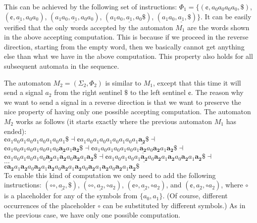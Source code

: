 \begin{example}
This can be achieved by the following set of instructions: $\Phi_1 = \{ (\cent, a_0 a_0 a_0 a_0, \$)$, $(\cent, \underline{a_1}, a_0 a_0)$, $(a_1 a_0, \underline{a_1}, a_0 a_0)$, $(a_1 a_0, \underline{a_1}, a_0 \$)$, $(a_1 a_0, \underline{a_1}, \$) \}$. It can be easily verified that the only words accepted by the automaton $M_1$ are the words shown in the above accepting computation. This is because if we proceed in the reverse direction, starting from the empty word, then we basically cannot get anything else than what we have in the above computation. This property also holds for all subsequent automata in the sequence.

The automaton $M_2 = (\Sigma_2, \Phi_2)$ is similar to $M_1$, except that this time it will send a signal $a_2$ from the right sentinel $\$$ to the left sentinel $\cent$. The reason why we want to send a signal in a reverse direction is that we want to preserve the nice property of having only one possible accepting computation. The automaton $M_2$ works as follows (it starts exactly where the previous automaton $M_1$ has ended):
\\

\indent $\cent a_1 a_0 a_1 a_0 a_1 a_0 a_1 a_0 a_1 \$ \dashv 
\cent a_1 a_0 a_1 a_0 a_1 a_0 a_1 a_0 a_1 \underline{\mathbf{a_2}} \$ \dashv$\\
\indent $\cent a_1 a_0 a_1 a_0 a_1 a_0 a_1 a_0 
\underline{\mathbf{a_2}} a_1 \mathbf{a_2} \$ \dashv
\cent a_1 a_0 a_1 a_0 a_1 a_0 a_1 
\underline{\mathbf{a_2}} a_0 \mathbf{a_2} a_1 \mathbf{a_2} \$ \dashv$\\
\indent $\cent a_1 a_0 a_1 a_0 a_1 a_0 
\underline{\mathbf{a_2}} a_1 \mathbf{a_2} a_0 \mathbf{a_2} a_1 \mathbf{a_2} \$ \dashv
\cent a_1 a_0 a_1 a_0 a_1 \underline{\mathbf{a_2}} a_0 \mathbf{a_2} a_1 
\mathbf{a_2} a_0 \mathbf{a_2} a_1 \mathbf{a_2} \$ \dashv$\\
\indent $\ldots$\\
\indent $\cent \mathbf{a_2} a_1 \mathbf{a_2} a_0 \mathbf{a_2} a_1 
\mathbf{a_2} a_0 \mathbf{a_2} a_1 \mathbf{a_2} a_0 \mathbf{a_2} a_1 
\mathbf{a_2} a_0 \mathbf{a_2} a_1 \mathbf{a_2} \$$
\\

To enable this kind of computation we only need to add the following instructions: $(\circ \circ, \underline{a_2}, \$)$, $(\circ \circ, \underline{a_2}, \circ a_2)$, $(\cent \circ, \underline{a_2}, \circ a_2)$, and $(\cent, \underline{a_2}, \circ a_2)$, where $\circ$ is a placeholder for any of the symbols from $\{ a_0, a_1 \}$. (Of course, different occurrences of the placeholder $\circ$ can be substituted by  different symbols.) As in the previous case, we have only one possible computation.


\end{example}
